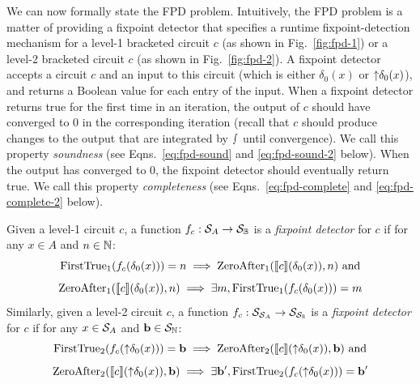 We can now formally state the FPD problem. Intuitively, the FPD problem is a matter of providing a fixpoint detector that specifies a runtime fixpoint-detection mechanism for a level-1 bracketed circuit $c$ (as shown in Fig.~\ref{fig:fpd-1}) or a level-2 bracketed circuit $c$ (as shown in Fig.~\ref{fig:fpd-2}). A fixpoint detector accepts a circuit $c$ and an input to this circuit (which is either $\delta_0(x)$ or ${\uparrow}\delta_0(x)$), and returns a Boolean value for each entry of the input. When a fixpoint detector returns true for the first time in an iteration, the output of $c$ should have converged to $0$ in the corresponding iteration (recall that $c$ should produce changes to the output that are integrated by $\smallint$ until convergence). We call this property \textit{soundness}
(see Eqns.~\eqref{eq:fpd-sound} and \eqref{eq:fpd-sound-2} below).
When the output has converged to $0$, the fixpoint detector should eventually return true. We call this property \textit{completeness}
(see Eqns.~\eqref{eq:fpd-complete} and \eqref{eq:fpd-complete-2} below).
\begin{definition}\label{def:fpd-problem}
    Given a level-1 circuit $c$, a function $f_c: \mathcal{S}_{A} \to \mathcal{S}_{\mathbb{B}}$ is a \textit{fixpoint detector} for $c$ if for any $x \in A$ and $n \in \mathbb{N}$:
    \begin{equation}\label{eq:fpd-sound}
        \text{FirstTrue}_1(f_c(\delta_0(x))) = n \implies \text{ZeroAfter}_1(\llbracket c \rrbracket(\delta_0(x)), n) \text{ and}
    \end{equation}
    \begin{equation}\label{eq:fpd-complete}
        \text{ZeroAfter}_1(\llbracket c \rrbracket(\delta_0(x)), n) \implies \exists m, \text{FirstTrue}_1(f_c(\delta_0(x))) = m
    \end{equation}
    Similarly, given a level-2 circuit $c$, a function $f_c: \mathcal{S}_{\mathcal{S}_{A}} \to \mathcal{S}_{\mathcal{S}_{\mathbb{B}}}$ is a \textit{fixpoint detector} for $c$ if
    for any $x \in \mathcal{S}_{A}$ and $\mathbf{b} \in \mathcal{S}_{\mathbb{N}}$:
    \begin{equation}\label{eq:fpd-sound-2}
        \text{FirstTrue}_2(f_c({\uparrow}\delta_0(x))) = \mathbf{b} \implies \text{ZeroAfter}_2(\llbracket c \rrbracket({\uparrow}\delta_0(x)), \mathbf{b}) \text{ and}
    \end{equation}
    \begin{equation}\label{eq:fpd-complete-2}
        \text{ZeroAfter}_2(\llbracket c \rrbracket({\uparrow}\delta_0(x)), \mathbf{b}) \implies \exists \mathbf{b}', \text{FirstTrue}_2(f_c({\uparrow}\delta_0(x))) = \mathbf{b}'
    \end{equation}
\end{definition}

